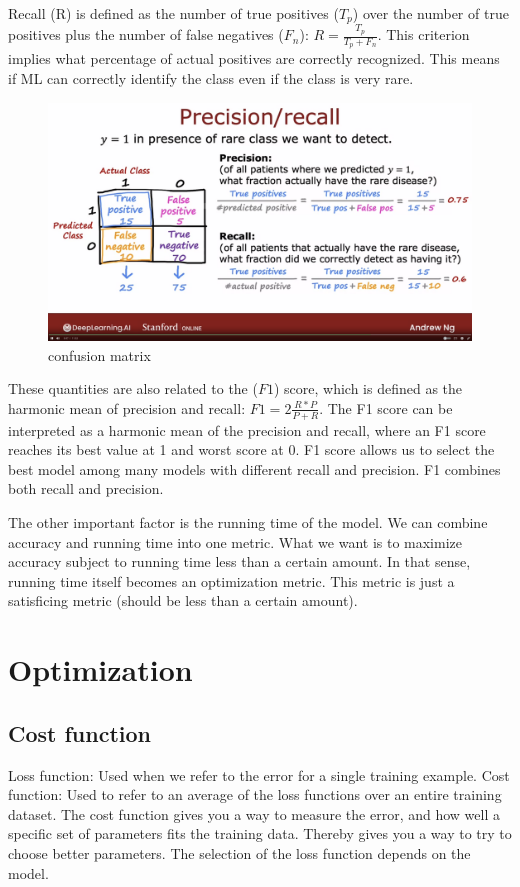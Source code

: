 \documentclass[12pt]{report}
\begin{document}
Recall (R) is defined as the number of true positives ($T_p$) over the number of true positives plus the number of false negatives ($F_n$): $R = \frac{T_p}{T_p + F_n} $. This criterion implies what percentage of actual positives are correctly recognized. This means if ML can correctly identify the class even if the class is very rare.


\begin{figure}[H]
  \centering
  \includegraphics[trim =0.0cm 0.0cm 0.0cm 0.0cm, clip, scale=0.15]{pics/confusionMatrix.png}
  \caption{confusion matrix}
\end{figure}


These quantities are also related to the ($F1$) score, which is defined as the harmonic mean of precision and recall: $F1 = 2 \frac{R * P}{ P + R } $. The F1 score can be interpreted as a harmonic mean of the precision and recall, where an F1 score reaches its best value at 1 and worst score at 0. F1 score allows us to select the best model among many models with different recall and precision. F1 combines both recall and precision.

The other important factor is the running time of the model. We can combine accuracy and running time into one metric. What we want is to maximize accuracy subject to running time less than a certain amount. In that sense, running time itself becomes an optimization metric. This metric is just a satisficing metric (should be less than a certain amount).

\section{Optimization}

\subsection{Cost function}
\label{sec:cost}
Loss function: Used when we refer to the error for a single training example. Cost function: Used to refer to an average of the loss functions over an entire training dataset.
The cost function gives you a way to measure the error, and how well a specific set of parameters fits the training data. Thereby gives you a way to try to choose better parameters. The selection of the loss function depends on the model.
\end{document}
